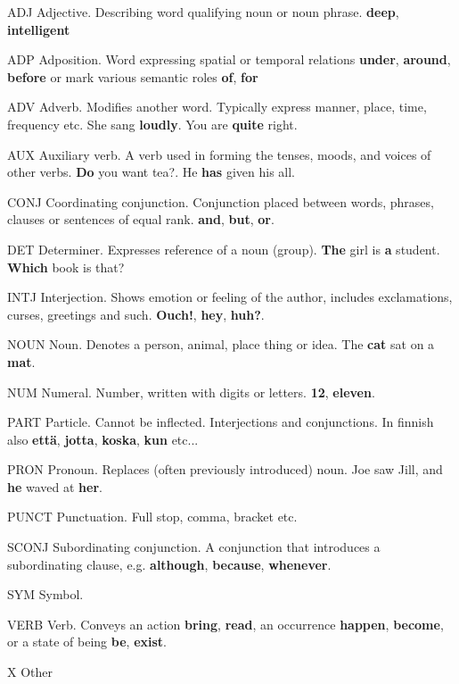 \documentclass[12pt,a4paper,english
]{tutthesis}
\begin{document}
\begin{termlist}
\item[ADJ] Adjective. Describing word qualifying noun or noun phrase. \textbf{deep}, \textbf{intelligent}
\item[ADP] Adposition. Word expressing spatial or temporal relations \textbf{under}, \textbf{around}, \textbf{before} or mark various semantic roles \textbf{of}, \textbf{for}
\item[ADV] Adverb. Modifies another word. Typically express manner, place, time, frequency etc. She sang \textbf{loudly}. You are \textbf{quite} right.
\item[AUX] Auxiliary verb. A verb used in forming the tenses, moods, and voices of other verbs. \textbf{Do} you want tea?. He \textbf{has} given his all.
\item[CONJ] Coordinating conjunction. Conjunction placed between words, phrases, clauses or sentences of equal rank. \textbf{and}, \textbf{but}, \textbf{or}.
\item[DET] Determiner. Expresses reference of a noun (group). \textbf{The} girl is \textbf{a} student. \textbf{Which} book is that?
\item[INTJ] Interjection. Shows emotion or feeling of the author, includes exclamations, curses, greetings and such. \textbf{Ouch!}, \textbf{hey}, \textbf{huh?}.
\item[NOUN] Noun. Denotes a person, animal, place thing or idea. The \textbf{cat} sat on a \textbf{mat}.
\item[NUM] Numeral. Number, written with digits or letters. \textbf{12}, \textbf{eleven}.
\item[PART] Particle. Cannot be inflected. Interjections and conjunctions. In finnish also \textbf{että}, \textbf{jotta}, \textbf{koska}, \textbf{kun} etc...
\item[PRON] Pronoun. Replaces (often previously introduced) noun. Joe saw Jill, and \textbf{he} waved at \textbf{her}.
\item[PUNCT] Punctuation. Full stop, comma, bracket etc.
\item[SCONJ] Subordinating conjunction. A conjunction that introduces a subordinating clause, e.g. \textbf{although}, \textbf{because}, \textbf{whenever}.
\item[SYM] Symbol.
\item[VERB] Verb. Conveys an action \textbf{bring}, \textbf{read}, an occurrence \textbf{happen}, \textbf{become}, or a state of being \textbf{be}, \textbf{exist}.
\item[X] Other
\end{termlist}
\end{document}
